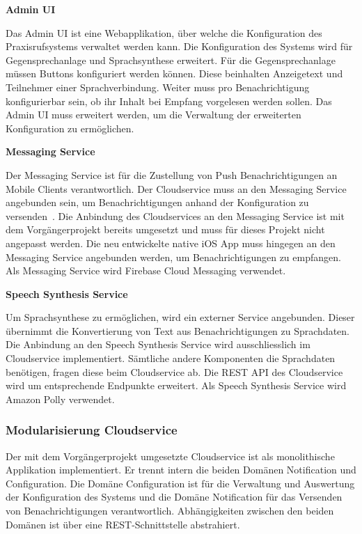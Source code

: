 \textbf{Admin UI}

Das Admin UI ist eine Webapplikation, über welche die Konfiguration des Praxisrufsystems verwaltet werden kann.
Die Konfiguration des Systems wird für Gegensprechanlage und Sprachsynthese erweitert.
Für die Gegensprechanlage müssen Buttons konfiguriert werden können.
Diese beinhalten Anzeigetext und Teilnehmer einer Sprachverbindung.
Weiter muss pro Benachrichtigung konfigurierbar sein, ob ihr Inhalt bei Empfang vorgelesen werden sollen.
Das Admin UI muss erweitert werden, um die Verwaltung der erweiterten Konfiguration zu ermöglichen.

\textbf{Messaging Service}

Der Messaging Service ist für die Zustellung von Push Benachrichtigungen an Mobile Clients verantwortlich.
Der Cloudservice muss an den Messaging Service angebunden sein, um Benachrichtigungen anhand der Konfiguration zu versenden~\cite{ip5}.
Die Anbindung des Cloudservices an den Messaging Service ist mit dem Vorgängerprojekt bereits umgesetzt und muss für dieses Projekt nicht angepasst werden.
Die neu entwickelte native iOS App muss hingegen an den Messaging Service angebunden werden, um Benachrichtigungen zu empfangen.
Als Messaging Service wird Firebase Cloud Messaging verwendet.

\clearpage

\textbf{Speech Synthesis Service}

Um Sprachsynthese zu ermöglichen, wird ein externer Service angebunden.
Dieser übernimmt die Konvertierung von Text aus Benachrichtigungen zu Sprachdaten.
Die Anbindung an den Speech Synthesis Service wird ausschliesslich im Cloudservice implementiert.
Sämtliche andere Komponenten die Sprachdaten benötigen, fragen diese beim Cloudservice ab.
Die REST API des Cloudservice wird um entsprechende Endpunkte erweitert.
Als Speech Synthesis Service wird Amazon Polly verwendet.

\subsubsection{Modularisierung Cloudservice}

Der mit dem Vorgängerprojekt umgesetzte Cloudservice ist als monolithische Applikation implementiert.
Er trennt intern die beiden Domänen Notification und Configuration.
Die Domäne Configuration ist für die Verwaltung und Auswertung der Konfiguration des Systems und die Domäne Notification für das Versenden von Benachrichtigungen verantwortlich.
Abhängigkeiten zwischen den beiden Domänen ist über eine REST-Schnittstelle abstrahiert.

